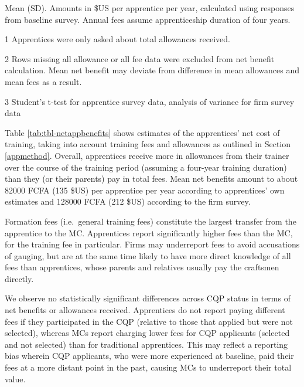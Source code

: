 \documentclass[
  11pt,
a4paper
]{article}
\begin{document}
\begin{table}[H]
{\begin{threeparttable}
\begin{tabular}[t]{lccccc}
\bottomrule
\end{tabular}
\begin{tablenotes}
\small
\item Mean (SD). Amounts in \$US per apprentice per year, calculated using responses from baseline survey. Annual fees assume apprenticeship duration of four years.
\item[1] Apprentices were only asked about total allowances received.
\item[2] Rows missing all allowance or all fee data were excluded from net benefit calculation. Mean net benefit may deviate from difference in mean allowances and mean fees as a result.
\item[3] Student's t-test for apprentice survey data, analysis of variance for firm survey data
\end{tablenotes}
\end{threeparttable}}
\end{table}

\noindent Table \ref{tab:tbl-netappbenefits} shows estimates of the apprentices' net cost of training, taking into account training fees and allowances as outlined in Section \ref{appmethod}. Overall, apprentices receive more in allowances from their trainer over the course of the training period (assuming a four-year training duration) than they (or their parents) pay in total fees. Mean net benefits amount to about 82000 FCFA (135 \$US) per apprentice per year according to apprentices' own estimates and 128000 FCFA (212 \$US) according to the firm survey.

Formation fees (i.e.~general training fees) constitute the largest transfer from the apprentice to the MC. Apprentices report significantly higher fees than the MC, for the training fee in particular. Firms may underreport fees to avoid accusations of gauging, but are at the same time likely to have more direct knowledge of all fees than apprentices, whose parents and relatives usually pay the craftsmen directly.

We observe no statistically significant differences across CQP status in terms of net benefits or allowances received. Apprentices do not report paying different fees if they participated in the CQP (relative to those that applied but were not selected), whereas MCs report charging lower fees for CQP applicants (selected and not selected) than for traditional apprentices. This may reflect a reporting bias wherein CQP applicants, who were more experienced at baseline, paid their fees at a more distant point in the past, causing MCs to underreport their total value.
\end{document}

